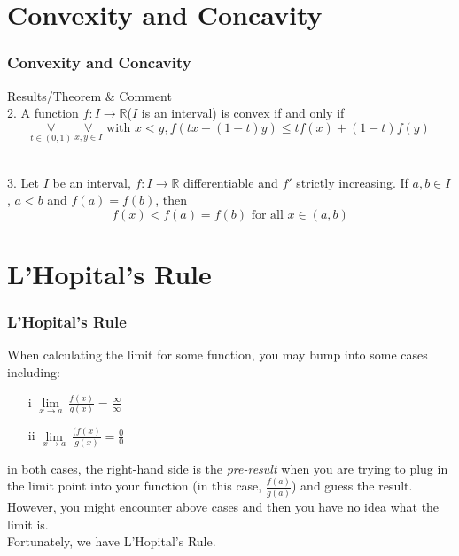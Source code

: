 \documentclass[12pt, t]{beamer}
\renewcommand{\emph}[1]{{\color{Turquoise3}\textsl{#1}}}
\begin{document}
\section{Convexity and Concavity}
\begin{frame}
    \frametitle{Convexity and Concavity}
    Results/Theorem \& Comment\\
    \vspace{1em}
    2. A function $f:I\rightarrow\mathbb{R}$($I$ is an interval) is convex if and only if
    \begin{equation*}
        \underset{t\in(0,1)}{\forall}\ \underset{x,y\in I}{\forall}\text{ with } x<y, f(tx+(1-t)y)\leq tf(x)+(1-t)f(y)
    \end{equation*}\\

    \vspace{2em}

    3. Let $I$ be an interval, $f:I\rightarrow\mathbb{R}$ differentiable and $f'$ strictly increasing. If $a, b\in I$, $a<b$ and
    $f(a)=f(b)$, then
    \begin{equation*}
        f(x)<f(a)=f(b)\text{ for all }x\in(a,b)
    \end{equation*}

\end{frame}

\section{L'Hopital's Rule}
\begin{frame}
    \frametitle{L'Hopital's Rule}
    When calculating the limit for some function, you may bump into some cases including:
    \begin{center}
        \begin{enumerate}
            \center \item[i] $\underset{x\rightarrow a}{\lim}\ \frac{f(x)}{g(x)} =\frac{\infty}{\infty}$
                \center \item[ii]$\underset{x\rightarrow a}{\lim}\ \frac{(f(x)}{g(x)} = \frac{0}{0}$
        \end{enumerate}
    \end{center}

    \hspace{1em}
    in both cases, the right-hand side is the \emph{pre-result} when you are trying to plug in the limit point into your function
    (in this case, $\frac{f(a)}{g(a)}$)
    and guess the result. \\

    \hspace{1em}
    However, you might encounter above cases and then you have no idea what the limit is. \\
    \hspace{1em}
    Fortunately, we have L'Hopital's Rule.


\end{frame}
\end{document}
